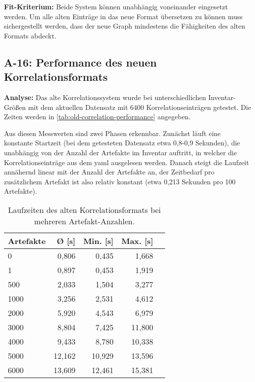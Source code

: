 \textbf{Fit-Kriterium:}
Beide System können unabhängig voneinander eingesetzt werden.
Um alle alten Einträge in das neue Format übersetzen zu können muss sichergestellt werden, dass der neue Graph mindestens die Fähigkeiten des alten Formats abdeckt.

\subsection{A-16: Performance des neuen Korrelationsformats}\label{subsec:req-correlation-format-performance}

\textbf{Analyse:}
Das alte Korrelationssystem wurde bei unterschiedlichen Inventar-Größen mit dem aktuellen Datensatz mit 6400 Korrelationseinträgen getestet.
Die Zeiten werden in \autoref{tab:old-correlation-performance} angegeben.

Aus diesen Messwerten sind zwei Phasen erkennbar.
Zunächst läuft eine konstante Startzeit (bei dem getesteten Datensatz etwa 0,8-0,9 Sekunden), die unabhängig von der Anzahl der Artefakte im Inventar auftritt, in welcher die Korrelationseinträge aus dem \acrshort{yaml} ausgelesen werden.
Danach steigt die Laufzeit annähernd linear mit der Anzahl der Artefakte an, der Zeitbedarf pro zusätzlichem Artefakt ist also relativ konstant (etwa 0,213 Sekunden pro 100 Artefakte).

\begin{table}[h!]
    \centering
    \begin{tabular}{l r r r r}
        \toprule
        \textbf{Artefakte} & \textbf{Ø [s]} & \textbf{Min. [s]} & \textbf{Max. [s]} \\
        \midrule
        0                  & 0,806          & 0,435             & 1,668             \\
        1                  & 0,897          & 0,453             & 1,919             \\
        500                & 2,033          & 1,504             & 3,277             \\
        1000               & 3,256          & 2,531             & 4,612             \\
        2000               & 5,920          & 4,543             & 6,979             \\
        3000               & 8,804          & 7,425             & 11,800            \\
        4000               & 9,433          & 8,780             & 10,338            \\
        5000               & 12,162         & 10,929            & 13,596            \\
        6000               & 13,609         & 12,461            & 15,381            \\
        \bottomrule
    \end{tabular}
    \caption{Laufzeiten des alten Korrelationsformats bei mehreren Artefakt-Anzahlen.}
    \label{tab:old-correlation-performance}
\end{table}

